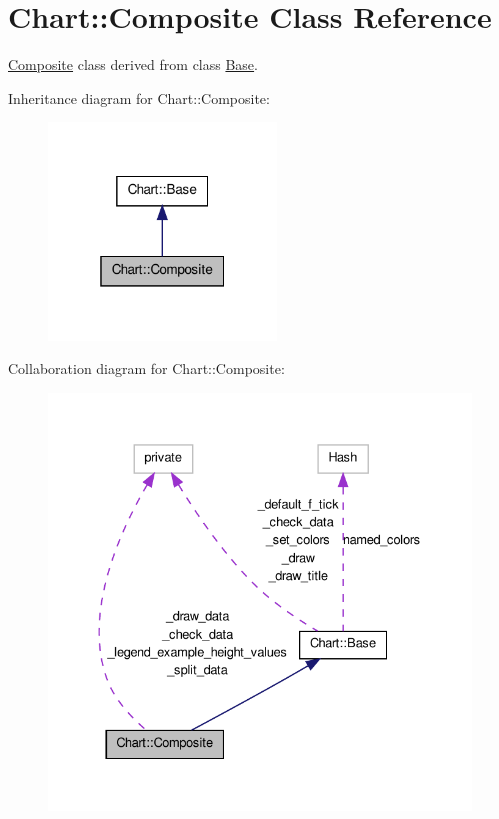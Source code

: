 \hypertarget{classChart_1_1Composite}{
\section{Chart::Composite Class Reference}
\label{classChart_1_1Composite}
}


\hyperlink{classChart_1_1Composite}{Composite} class derived from class \hyperlink{classChart_1_1Base}{Base}.  




Inheritance diagram for Chart::Composite:\nopagebreak
\begin{figure}[H]
\begin{center}
\leavevmode
\includegraphics[width=172pt]{classChart_1_1Composite__inherit__graph}
\end{center}
\end{figure}


Collaboration diagram for Chart::Composite:\nopagebreak
\begin{figure}[H]
\begin{center}
\leavevmode
\includegraphics[width=333pt]{classChart_1_1Composite__coll__graph}
\end{center}
\end{figure}
